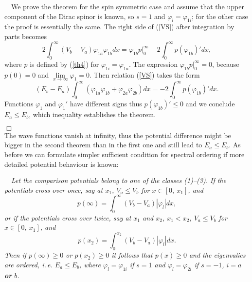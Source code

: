 \documentclass[amsmath,amssymb,superscriptaddress,showkeys, showpacs, aps, nofootinbib]{revtex4}
\begin{document}
 ~~We prove the theorem for the spin symmetric case and assume that the upper component of the Dirac spinor is known, so $s=1$ and $\varphi_l=\varphi_{1i}$; for the other case the proof is essentially the same. The right side of (\ref{VS}) after integration by parts becomes
\begin{equation*}
2\int_0^\infty (V_b-V_a)\varphi_{1a}\varphi_{1b}dx=\varphi_{1b}p|_0^\infty
-2\int_0^\infty p\left(\varphi_{1b}\right)'dx,
\end{equation*}
where $p$ is defined by (\ref{th4}) for $\varphi_{1i}=\varphi_{1a}$. The expression $\varphi_{1b}p|_0^\infty=0$, because $p(0)=0$ and $\lim\limits_{x\to\infty}\varphi_{1}=0$. Then relation (\ref{VS}) takes the form
\begin{equation*}
(E_b-E_a)\int_0^\infty (\varphi_{1a}\varphi_{1b}+\varphi_{2a}\varphi_{2b})dx=
-2\int_0^\infty p\left(\varphi_{1b}\right)'dx.
\end{equation*}
Functions $\varphi_1$ and $\varphi_1'$ have different signs thus $p\left(\varphi_{1b}\right)'\le 0$ and we conclude $E_a\le E_b$, which inequality establishes the theorem.

\hfill $\Box$\\

The wave functions vanish at infinity, thus the potential difference might be bigger in the second theorem than in the first one and still lead to $E_a\le E_b$. As before we can formulate simpler sufficient condition for spectral ordering if more detailed potential behaviour is known:

\medskip

 ~~{\it Let the comparison potentials belong to one of the classes (1)--(3). If the potentials cross over once, say at $x_1$, $V_a\le V_b$ for $x\in [0,\ x_1]$, and
\begin{equation*}
p(\infty)=\int_0^\infty (V_b-V_a)|\varphi_{l}|dx,
\end{equation*}
or if the potentials cross over twice, say at $x_1$ and $x_2$, $x_1<x_2$, $V_a\le V_b$ for $x\in [0,\ x_1]$, and
\begin{equation*}
p(x_2)=\int_0^{x_2} (V_b-V_a)|\varphi_{l}|dx.
\end{equation*}
Then if $p(\infty)\ge 0$ or $p(x_2)\ge 0$ it follows that $p(x)\ge 0$ and the eigenvalies are ordered, i.\,e. $E_a\le E_b$, where $\varphi_l=\varphi_{1i}$ if $s=1$ and $\varphi_l=\varphi_{2i}$ if $s=-1$, $i=a$ {\bf or} $b$.} 

\medskip
\end{document}
